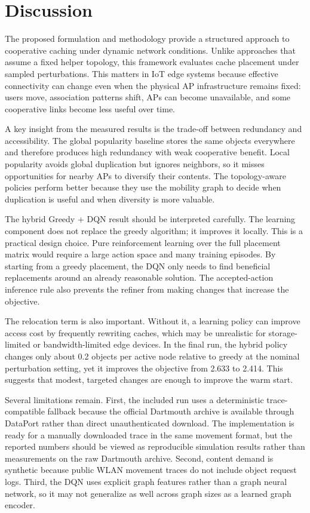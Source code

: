 \section{Discussion}

The proposed formulation and methodology provide a structured approach to cooperative caching under dynamic network conditions. Unlike approaches that assume a fixed helper topology, this framework evaluates cache placement under sampled perturbations. This matters in IoT edge systems because effective connectivity can change even when the physical AP infrastructure remains fixed: users move, association patterns shift, APs can become unavailable, and some cooperative links become less useful over time.

A key insight from the measured results is the trade-off between redundancy and accessibility. The global popularity baseline stores the same objects everywhere and therefore produces high redundancy with weak cooperative benefit. Local popularity avoids global duplication but ignores neighbors, so it misses opportunities for nearby APs to diversify their contents. The topology-aware policies perform better because they use the mobility graph to decide when duplication is useful and when diversity is more valuable.

The hybrid Greedy + DQN result should be interpreted carefully. The learning component does not replace the greedy algorithm; it improves it locally. This is a practical design choice. Pure reinforcement learning over the full placement matrix would require a large action space and many training episodes. By starting from a greedy placement, the DQN only needs to find beneficial replacements around an already reasonable solution. The accepted-action inference rule also prevents the refiner from making changes that increase the objective.

The relocation term is also important. Without it, a learning policy can improve access cost by frequently rewriting caches, which may be unrealistic for storage-limited or bandwidth-limited edge devices. In the final run, the hybrid policy changes only about 0.2 objects per active node relative to greedy at the nominal perturbation setting, yet it improves the objective from 2.633 to 2.414. This suggests that modest, targeted changes are enough to improve the warm start.

Several limitations remain. First, the included run uses a deterministic trace-compatible fallback because the official Dartmouth archive is available through DataPort rather than direct unauthenticated download. The implementation is ready for a manually downloaded trace in the same movement format, but the reported numbers should be viewed as reproducible simulation results rather than measurements on the raw Dartmouth archive. Second, content demand is synthetic because public WLAN movement traces do not include object request logs. Third, the DQN uses explicit graph features rather than a graph neural network, so it may not generalize as well across graph sizes as a learned graph encoder.

